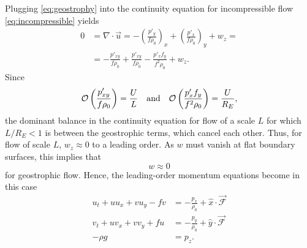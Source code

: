 Plugging \eqref{eq:geostrophy} into the continuity equation for incompressible flow \eqref{eq:incompressible} yields
%
\begin{align}
0 &= \nabla \cdot \vec{u} = - \left( \frac{p'_y}{f\rho_0} \right)_x + \left( \frac{p'_x}{f\rho_0} \right)_y + w_z = \\
&= - \frac{p'_{xy}}{f\rho_0} + \frac{p'_{xy}}{f\rho_0} - \frac{p'_x f_y}{f^2 \rho_0} + w_z.
\end{align}
%
Since
%
\begin{equation}
\mathcal{O}\left(\frac{p'_{xy}}{f \rho_0}\right) = \frac{U}{L} \quad \text{and} \quad \mathcal{O}\left(\frac{p'_x f_y}{f^2 \rho_0}\right) = \frac{U}{R_E},
\end{equation}
%
the dominant balance in the continuity equation for flow of a scale \(L\) for which \(L/R_E < 1\) is between the geostrophic terms, which cancel each other. Thus, for flow of scale \(L\), \(w_z \approx 0\) to a leading order. As \(w\) must vanish at flat boundary surfaces, this implies that
%
\begin{equation}
w \approx 0 \label{eq:continuityhor}
\end{equation}
%
for geostrophic flow. Hence, the leading-order momentum equations become in this case
%
\begin{align}
u_t + uu_x + vu_y - fv &= -\frac{p_x}{\rho_0} + \hat{x} \cdot \vec{\mathcal{F}} \\
v_t + uv_x + vv_y + fu &= - \frac{p_y}{\rho_0} + \hat{y} \cdot \vec{\mathcal{F}} \label{eq:momentum-leading} \\
-\rho g &= p_z.
\end{align}

